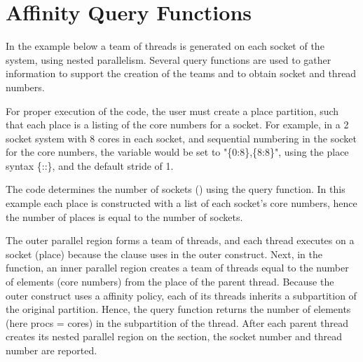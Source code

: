 \newpage
\section{Affinity Query Functions}
\label{sec: affinity_query}

In the example below a team of threads is generated on each socket of
the system, using nested parallelism. Several query functions are used
to gather information to support the creation of the teams and to obtain 
socket and thread numbers.

For proper execution of the code, the user must create a place partition, such that
each place is a listing of the core numbers for a socket. For example,
in a 2 socket system with 8 cores in each socket, and sequential numbering
in the socket for the core numbers, the  variable would be set
to "\{0:8\},\{8:8\}", using the place syntax \{::\},
and the default stride of 1.

The code determines the number of sockets ()
using the  query function.
In this example each place is constructed with a list of 
each socket's core numbers, hence the number of places is equal
to the number of sockets. 

The outer parallel region forms a team of threads, and each thread 
executes on a socket (place) because the  clause uses 
 in the outer  construct.
Next, in the  function, an inner parallel region creates a team 
of threads equal to the number of elements (core numbers) from the place
of the parent thread. Because the outer  construct uses 
a  affinity policy, each of its threads inherits a subpartition of 
the original partition.  Hence, the  query function
returns the number of elements (here procs = cores) in the subpartition of the thread.  
After each parent thread creates its nested parallel region on the section,
the socket number and thread number are reported.

